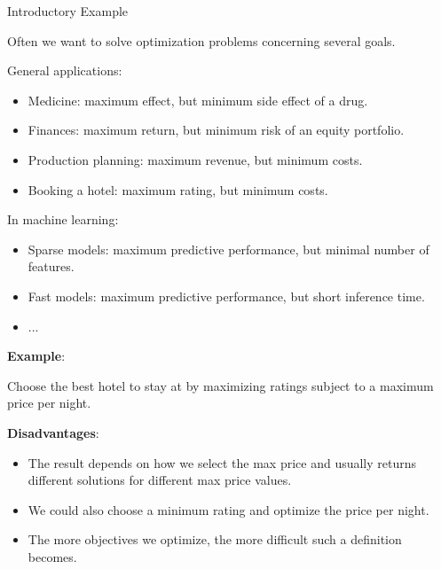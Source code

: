 \begin{frame}[allowframebreaks]{Introductory Example}

Often we want to solve optimization problems concerning several goals.

General applications:
\begin{itemize}
\item Medicine: maximum effect, but minimum side effect of a drug.
\item Finances: maximum return, but minimum risk of an equity portfolio.
\item Production planning: maximum revenue, but minimum costs.
\item Booking a hotel: maximum rating, but minimum costs.
\end{itemize}

In machine learning:
\begin{itemize}
\item Sparse models: maximum predictive performance, but minimal number of features.
\item Fast models: maximum predictive performance, but short inference time.
\item ...
\end{itemize}


\vspace*{0.2cm}

\framebreak

\textbf{Example}:

Choose the best hotel to stay at by maximizing ratings subject to a maximum price per night.

\vspace*{0.2cm}

 \textbf{Disadvantages}:

\begin{itemize}
 \item The result depends on how we select the max price and usually returns different solutions for different max price values.
 \item We could also choose a minimum rating and optimize the price per night.
 \item The more objectives we optimize, the more difficult such a definition becomes.
\end{itemize}

\vspace*{0.2cm}


\end{frame}
